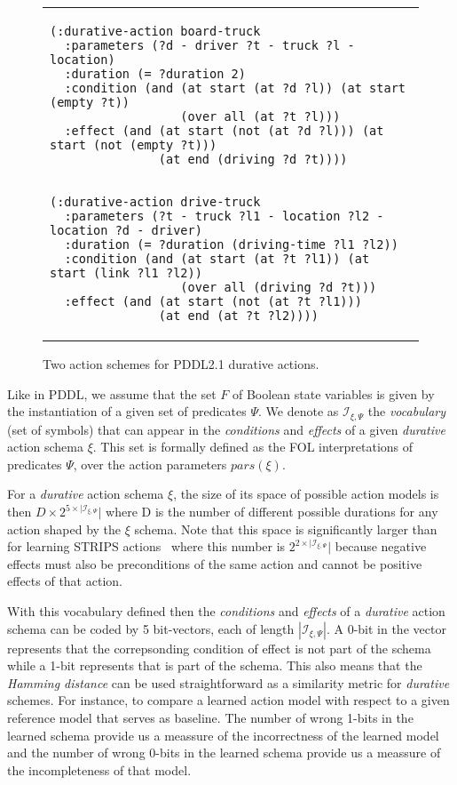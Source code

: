 \documentclass{ecai}
\begin{document}
\begin{figure}
  \begin{tabular}{p{\textwidth}}
\begin{tiny}    
\begin{verbatim}
(:durative-action board-truck
  :parameters (?d - driver ?t - truck ?l - location)
  :duration (= ?duration 2)
  :condition (and (at start (at ?d ?l)) (at start (empty ?t))
                  (over all (at ?t ?l)))
  :effect (and (at start (not (at ?d ?l))) (at start (not (empty ?t)))
               (at end (driving ?d ?t))))


(:durative-action drive-truck
  :parameters (?t - truck ?l1 - location ?l2 - location ?d - driver)
  :duration (= ?duration (driving-time ?l1 ?l2))
  :condition (and (at start (at ?t ?l1)) (at start (link ?l1 ?l2))
                  (over all (driving ?d ?t)))
  :effect (and (at start (not (at ?t ?l1))) 
               (at end (at ?t ?l2))))
\end{verbatim}
\end{tiny}    
\end{tabular}
\caption{\small Two action schemes for PDDL2.1 durative actions.}
\label{fig:exampleactions2}
\end{figure}

Like in PDDL, we assume that the set $F$ of Boolean state variables is given by the instantiation of a given set of predicates $\Psi$. We denote as ${\mathcal I}_{\xi,\Psi}$ the {\em vocabulary} (set of symbols) that can appear in the {\em conditions} and {\em effects} of a given {\em durative} action schema $\xi$. This set is formally defined as the FOL interpretations of predicates $\Psi$, over the action parameters $pars(\xi)$.

For a {\em durative} action schema $\xi$, the size of its space of possible action models is then $D\times 2^{5\times|{\mathcal I}_{\xi,\Psi}}|$ where D is the number of different possible durations for any action shaped by the $\xi$ schema. Note that this space is significantly larger than for learning STRIPS actions~\cite{yang2007learning} where this number is $2^{2\times|{\mathcal I}_{\xi,\Psi}}|$ because negative effects must also be preconditions of the same action and cannot be positive effects of that action.

With this vocabulary defined then the {\em conditions} and {\em effects} of a {\em durative} action schema can be coded by 5 bit-vectors, each of length $|{\mathcal I}_{\xi,\Psi}|$. A 0-bit in the vector represents that the correpsonding condition of effect is not part of the schema while a 1-bit represents that is part of the schema. This also means that the {\em Hamming distance} can be used straightforward as a similarity metric for {\em durative} schemes. For instance, to compare a learned action model with respect to a given reference model that serves as baseline. The number of wrong 1-bits in the learned schema provide us a meassure of the incorrectness of the learned model and the number of wrong 0-bits in the learned schema provide us a meassure of the incompleteness of that model.
\end{document}

